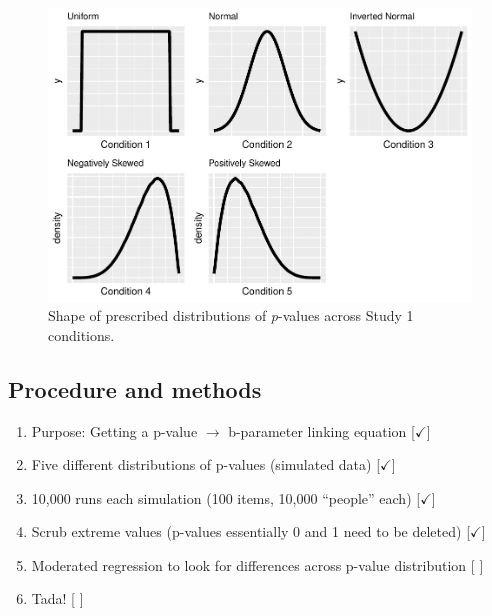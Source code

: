 \documentclass[
  jou]{apa6}
\providecommand{\tightlist}{%
  \setlength{\itemsep}{0pt}\setlength{\parskip}{0pt}}
\begin{document}
\begin{figure}
\centering
\includegraphics{ICC_project_files/figure-latex/simulatedgraphs-1.pdf}
\caption{\label{fig:simulatedgraphs}Shape of prescribed distributions of \emph{p}-values across Study 1 conditions.}
\end{figure}

\hypertarget{procedure-and-methods}{%
\subsection{Procedure and methods}\label{procedure-and-methods}}

\begin{enumerate}
\def\labelenumi{\arabic{enumi}.}
\tightlist
\item
  Purpose: Getting a p-value \(\rightarrow\) b-parameter linking equation {[}\(\checkmark\){]}
\item
  Five different distributions of p-values (simulated data) {[}\(\checkmark\){]}
\item
  10,000 runs each simulation (100 items, 10,000 ``people'' each) {[}\(\checkmark\){]}\\
\item
  Scrub extreme values (p-values essentially 0 and 1 need to be deleted) {[}\(\checkmark\){]}
\item
  Moderated regression to look for differences across p-value distribution {[} {]}
\item
  Tada! {[} {]}
\end{enumerate}
\end{document}
